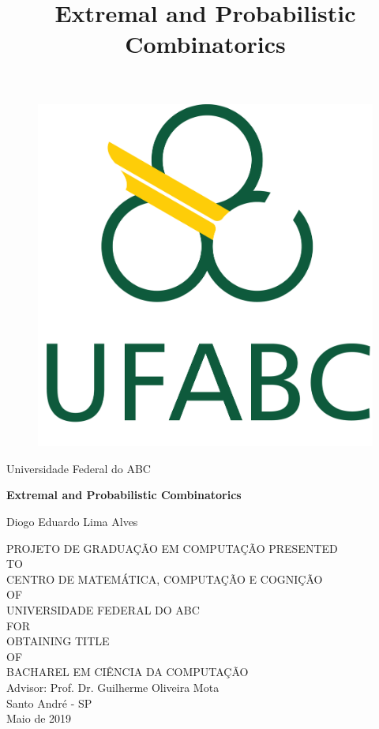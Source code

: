\documentclass[12pt,twoside,a4paper]{book}
\numberwithin{equation}{section}
\theoremstyle{remark}
\begin{document}

\title{Extremal and Probabilistic Combinatorics}

      \begin{figure}[h!]%
        \centering%
        \includegraphics[scale=0.2]{Figuras/logo.png}%
      \end{figure}%
\begin{center}
Universidade Federal do ABC\\

\vspace{2cm}

{
\fontsize{18pt}{\baselineskip}\selectfont \bf
Extremal and Probabilistic Combinatorics
}

\vspace{2cm}

Diogo Eduardo Lima Alves\\

\vspace{2cm}

PROJETO DE GRADUAÇÃO EM COMPUTAÇÃO PRESENTED\\
TO\\
CENTRO DE MATEMÁTICA, COMPUTAÇÃO E COGNIÇÃO\\
OF\\
UNIVERSIDADE FEDERAL DO ABC\\
FOR\\
OBTAINING TITLE\\
OF\\
BACHAREL EM CIÊNCIA DA COMPUTAÇÃO\\
\vspace{2cm}
Advisor: Prof. Dr. Guilherme Oliveira Mota\\
\vfill
Santo André - SP\\
Maio de 2019
\end{center}
\end{document}
